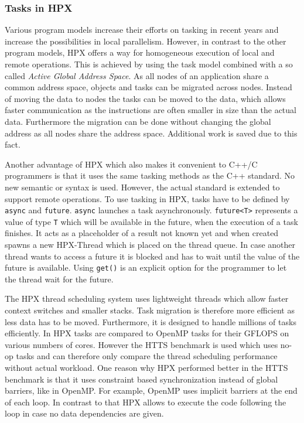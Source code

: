 	
\subsubsection{Tasks in HPX}
  \label{subsubsec:TasksHPX}
  Various program models increase their efforts on tasking in recent years and increase the possibilities in local parallelism.
  However, in contrast to the other program models, HPX offers a way for homogeneous execution of local and remote operations.
  This is achieved by using the task model combined with a so called \textit{Active Global Address Space}.
  As all nodes of an application share a common address space, objects and tasks can be migrated across nodes.
  Instead of moving the data to nodes the tasks can be moved to the data, which allows faster communication as the instructions are often smaller in size than the actual data.
  Furthermore the migration can be done without changing the global address as all nodes share the address space.
  Additional work is saved due to this fact.~\cite{Kaiser.2014}
  
  Another advantage of HPX which also makes it convenient to C++/C programmers is that it uses the same tasking methods as the C++ standard.
  No new semantic or syntax is used.
  However, the actual standard is extended to support remote operations.
  To use tasking in HPX, tasks have to be defined by \texttt{async} and \texttt{future}.
  \texttt{async} launches a task asynchronously.
  \texttt{future<T>} represents a value of type \texttt{T} which will be available in the future, when the execution of a task finishes.
  It acts as a placeholder of a result not known yet and when created spawns a new HPX-Thread which is placed on the thread queue.
  In case another thread wants to access a future it is blocked and has to wait until the value of the future is available.
  Using \texttt{get()} is an explicit option for the programmer to let the thread wait for the future.~\cite{Kaiser.2014}~\cite{TheSTEARGroup.2020}
  
  
  The HPX thread scheduling system uses lightweight threads which allow faster context switches and smaller stacks.
  Task migration is therefore more efficient as less data has to be moved.
  Furthermore, it is designed to handle millions of tasks efficiently.
  In \cite{Kaiser.2014} HPX tasks are compared to OpenMP tasks for their GFLOPS on various numbers of cores.
  However the HTTS benchmark is used which uses no-op tasks and can therefore only compare the thread scheduling performance without actual workload.
  One reason why HPX performed better in the HTTS benchmark is that it uses constraint based synchronization instead of global barriers, like in OpenMP.
  For example, OpenMP uses implicit barriers at the end of each loop.
  In contrast to that HPX allows to execute the code following the loop in case no data dependencies are given.
  
